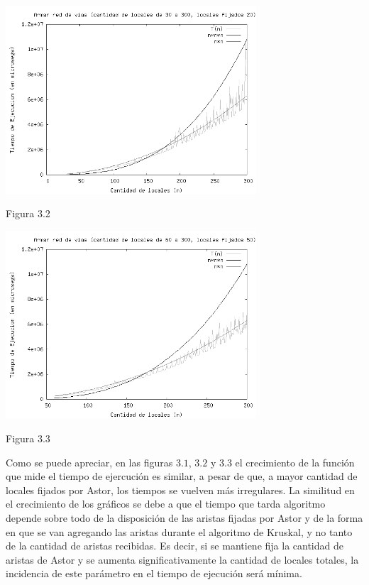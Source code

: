 \documentclass[a4paper,11pt] {article}
\begin{document}
\begin{center}
 \includegraphics[width=0.7\textwidth]{Plots/Tp2Ej3-Complejidad-20.png}
\begin{center}
Figura 3.2
\end{center}
\end{center}

\begin{center}
 \includegraphics[width=0.7\textwidth]{Plots/Tp2Ej3-Complejidad-50.png}
\begin{center}
Figura 3.3
\end{center}
\end{center}

Como se puede apreciar, en las figuras $3.1$, $3.2$ y $3.3$ el crecimiento de la funci\'on que mide el tiempo de ejercuci\'on es similar, a pesar de que, a mayor cantidad de locales fijados por Astor, los tiempos se vuelven m\'as irregulares. La similitud en el crecimiento de los gr\'aficos se debe a que el tiempo que tarda algoritmo depende sobre todo de la disposici\'on de las aristas fijadas por Astor y de la forma en que se van agregando las aristas durante el algoritmo de Kruskal, y no tanto de la cantidad de aristas recibidas. Es decir, si se mantiene fija la cantidad de aristas de Astor y se aumenta significativamente la cantidad de locales totales, la incidencia de este par\'ametro en el tiempo de ejecuci\'on ser\'a m\'inima.
\end{document}
